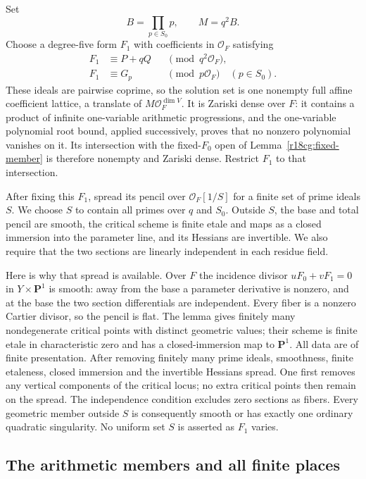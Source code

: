 Set
\[
                 B=\prod_{p\in S_0}p,\qquad M=q^2B.
 \tag{CG18.5}\label{r18cg:MB}
\]
Choose a degree-five form $F_1$ with coefficients in
$\mathcal O_F$ satisfying
\[
 \begin{aligned}
 F_1&\equiv P+qQ&&\pmod{q^2\mathcal O_F},\\
 F_1&\equiv G_p&&\pmod{p\mathcal O_F}\quad(p\in S_0).
 \end{aligned}
 \tag{CG18.6}\label{r18cg:coefficient-CRT}
\]
These ideals are pairwise coprime, so the solution set is
one nonempty full affine coefficient lattice, a translate
of $M\mathcal O_F^{\dim V}$.
It is Zariski dense over $F$: it contains a product of
infinite one-variable arithmetic progressions, and the
one-variable polynomial root bound, applied successively,
proves that no nonzero polynomial vanishes on it.
Its intersection with the fixed-$F_0$ open of
Lemma~\ref{r18cg:fixed-member} is therefore nonempty and
Zariski dense.  Restrict $F_1$ to that intersection.

After fixing this $F_1$, spread its pencil over
$\mathcal O_F[1/S]$ for a finite set of prime ideals $S$.
We choose $S$ to contain all primes over $q$ and $S_0$.
Outside $S$, the base and total pencil are smooth, the
critical scheme is finite etale and maps as a closed
immersion into the parameter line, and its Hessians are
invertible.  We also require that the two sections are
linearly independent in each residue field.

Here is why that spread is available.  Over $F$ the
incidence divisor $uF_0+vF_1=0$ in $Y\times\mathbf P^1$
is smooth: away from the base a parameter derivative is
nonzero, and at the base the two section differentials
are independent.  Every fiber is a nonzero Cartier
divisor, so the pencil is flat.  The lemma gives finitely
many nondegenerate critical points with distinct geometric
values; their scheme is finite etale in characteristic
zero and has a closed-immersion map to $\mathbf P^1$.
All data are of finite presentation.  After removing
finitely many prime ideals, smoothness, finite etaleness,
closed immersion and the invertible Hessians spread.
One first removes any vertical components of the critical
locus; no extra critical points then remain on the spread.
The independence condition excludes zero sections as fibers.
Every geometric member outside $S$ is consequently smooth
or has exactly one ordinary quadratic singularity.
No uniform set $S$ is asserted as $F_1$ varies.

\subsection{The arithmetic members and all finite places}


